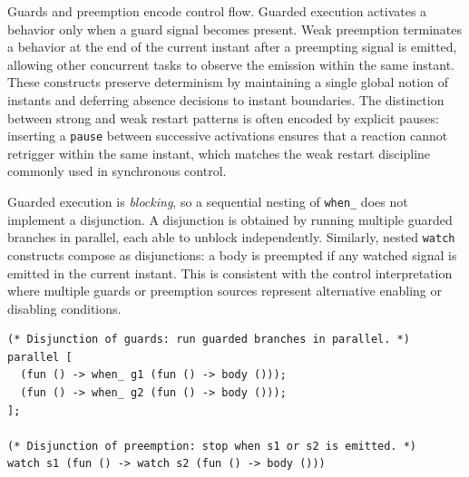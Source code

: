 Guards and preemption encode control flow. Guarded execution activates a
behavior only when a guard signal becomes present. Weak preemption terminates a
behavior at the end of the current instant after a preempting signal is
emitted, allowing other concurrent tasks to observe the emission within the
same instant. These constructs preserve determinism by maintaining a single
global notion of instants and deferring absence decisions to instant boundaries.
The distinction between strong and weak restart patterns is often encoded by
explicit pauses: inserting a \texttt{pause} between successive activations
ensures that a reaction cannot retrigger within the same instant, which matches
the weak restart discipline commonly used in synchronous control.

Guarded execution is \emph{blocking}, so a sequential nesting of \texttt{when\_}
does not implement a disjunction. A disjunction is obtained by running
multiple guarded branches in parallel, each able to unblock independently.
Similarly, nested \texttt{watch} constructs compose as disjunctions: a body is
preempted if any watched signal is emitted in the current instant. This is
consistent with the control interpretation where multiple guards or preemption
sources represent alternative enabling or disabling conditions.

\begin{lstlisting}[style=tempo]
(* Disjunction of guards: run guarded branches in parallel. *)
parallel [
  (fun () -> when_ g1 (fun () -> body ()));
  (fun () -> when_ g2 (fun () -> body ()));
];

(* Disjunction of preemption: stop when s1 or s2 is emitted. *)
watch s1 (fun () -> watch s2 (fun () -> body ()))
\end{lstlisting}
